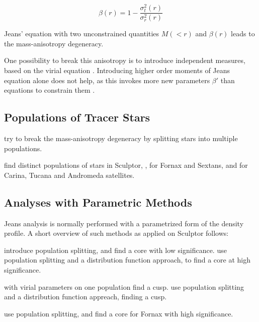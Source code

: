 \begin{equation}
\beta(r)=1-\frac{\sigma_t^2(r)}{\sigma_r^2(r)}
\end{equation}

Jeans' equation with two unconstrained quantities $M(<r)$ and
$\beta(r)$ leads to the mass-anisotropy degeneracy.

One possibility to break this anisotropy is to introduce independent
measures, based on the virial equation
\citep{RichardsonFairbairn2014}. Introducing higher order moments of
Jeans equation alone does not help, as this invokes more new
parameters $\beta'$ than equations to constrain them
\citep{RichardsonFairbairn2013}.



\subsection{Populations of Tracer Stars}
\citet{Battaglia 2008} try to break the mass-anisotropy degeneracy by
splitting stars into multiple populations.

\citet{WalkerPenarrubia2011}




\citep{Tolstoy+2004} find distinct populations of stars in Sculptor,
\citep{Battaglia+2006}, \citep{Battaglia2011} for Fornax and Sextans,
\citep{Harbeck+2001} and \citep{Bellazzini+2001} for Carina, Tucana
and Andromeda satellites.

\subsection{Analyses with Parametric Methods}
Jeans analysis is normally performed with a parametrized form of the
density profile. A short overview of such methods as applied on Sculptor follows:

\citep{Battaglia+2008} introduce population splitting, and find a core
with low significance. \citep{AmoriscoEvans2012} use population
splitting and a distribution function approach, to find a core at high
significance.

\citep{RichardsonFairbairn2014} with virial parameters on one
population find a cusp. \citep{Strigari+2014} use population
splitting and a distribution function appreach, finding a cusp.




\citep{WalkerPenarrubia2011} use population
splitting, and find a core for Fornax with high significance.


